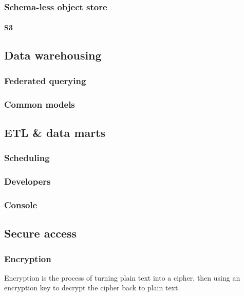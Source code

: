 \documentclass[10pt]{article}
\begin{document}
\subsubsection{Schema-less object store}
\paragraph{S3}

\subsection{Data warehousing}
\subsubsection{Federated querying}
\subsubsection{Common models}

\subsection{ETL \& data marts}
\subsubsection{Scheduling}
\subsubsection{Developers}
\subsubsection{Console}

\subsection{Secure access}
\subsubsection{Encryption}
Encryption is the process of turning plain text into a cipher, then using an encryption key to decrypt the cipher back to plain text.
\end{document}
